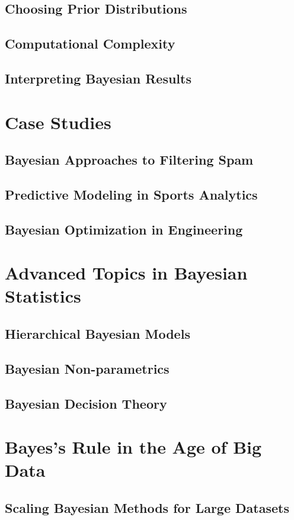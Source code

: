 \documentclass[12pt]{book} %
\begin{document}
\subsection{Choosing Prior Distributions}
\subsection{Computational Complexity}
\subsection{Interpreting Bayesian Results}

\section{Case Studies}
\subsection{Bayesian Approaches to Filtering Spam}
\subsection{Predictive Modeling in Sports Analytics}
\subsection{Bayesian Optimization in Engineering}

\section{Advanced Topics in Bayesian Statistics}
\subsection{Hierarchical Bayesian Models}
\subsection{Bayesian Non-parametrics}
\subsection{Bayesian Decision Theory}

\section{Bayes's Rule in the Age of Big Data}
\subsection{Scaling Bayesian Methods for Large Datasets}
\end{document}
